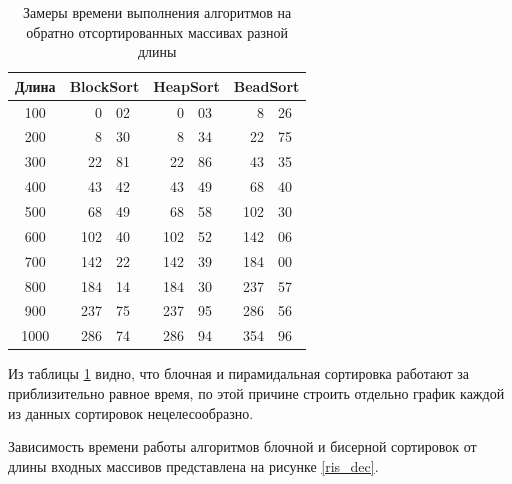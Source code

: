 \documentclass[a4paper,14pt, unknownkeysallowed]{extreport}
\begin{document}
\begin{table}[h!]
    \captionsetup{justification=raggedright,singlelinecheck=off}
    \caption{Замеры времени выполнения алгоритмов на обратно отсортированных массивах разной длины}
    \label{table:t_dec}
	\begin{center}
        \begin{tabular}{| c | r@{.}l | r@{.}l | r@{.}l |}
        \hline
        Длина &
        \multicolumn{2}{c|}{BlockSort} & 
        \multicolumn{2}{c|}{HeapSort} &
        \multicolumn{2}{c|}{BeadSort}\\ \hline
        
        100 & 0&02 & 0&03 & 8&26 \\ \hline 
				
        200 & 8&30 & 8&34 & 22&75 \\ \hline 
		
        300 & 22&81 & 22&86 & 43&35 \\ \hline 
				
        400 & 43&42 & 43&49 & 68&40 \\ \hline 
				
        500 & 68&49 & 68&58 & 102&30 \\ \hline
        
        600 & 102&40 & 102&52 & 142&06 \\ \hline 
				
        700 & 142&22 & 142&39 & 184&00 \\ \hline 
				
        800 & 184&14 & 184&30 & 237&57 \\ \hline 
				
        900 & 237&75 & 237&95 & 286&56 \\ \hline 
				
        1000 & 286&74 & 286&94 & 354&96 \\ \hline
       
        \end{tabular}
    \end{center}
\end{table}

Из таблицы \ref{table:t_dec} видно, что блочная и пирамидальная сортировка работают за приблизительно равное время, по этой причине строить отдельно график каждой из данных сортировок нецелесообразно.

Зависимость времени работы алгоритмов блочной и бисерной сортировок от длины входных массивов представлена на рисунке \ref{ris_dec}.
\end{document}
